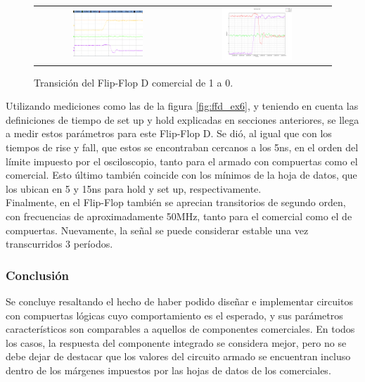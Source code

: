\begin{figure}[H]
    \centering
    \begin{tabular}{c c}
        \includegraphics[width=0.5\textwidth]{../EJ6/Recursos/com_ffd_fall_osc} &
        \includegraphics[width=0.5\textwidth]{../EJ6/Recursos/com_ffd_fall}
    \end{tabular}
    \caption{Transición del Flip-Flop D comercial de 1 a 0.}
    \label{fig:com_ffd_fall_ex6}
\end{figure}

Utilizando mediciones como las de la figura \ref{fig:ffd_ex6}, y teniendo en cuenta las definiciones de tiempo de set up y hold explicadas en secciones anteriores, se 
llega a medir estos parámetros para este Flip-Flop D.
Se dió, al igual que con los tiempos de rise y fall, que estos se encontraban cercanos a los 5ns, en el orden del límite impuesto por el osciloscopio, tanto para el armado 
con compuertas como el comercial.
Esto último también coincide con los mínimos de la hoja de datos, que los ubican en 5 y 15ns para hold y set up, respectivamente.\\
Finalmente, en el Flip-Flop también se aprecian transitorios de segundo orden, con frecuencias de aproximadamente 50MHz, tanto para el comercial como el de compuertas.
Nuevamente, la señal se puede considerar estable una vez transcurridos 3 períodos.



\subsubsection{Conclusión}
Se concluye resaltando el hecho de haber podido diseñar e implementar circuitos con compuertas lógicas cuyo comportamiento es el esperado, y sus parámetros 
característicos son comparables a aquellos de componentes comerciales.
En todos los casos, la respuesta del componente integrado se considera mejor, pero no se debe dejar de destacar que los valores del circuito armado se encuentran incluso 
dentro de los márgenes impuestos por las hojas de datos de los comerciales.